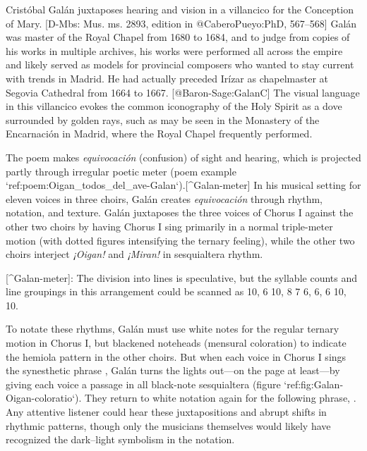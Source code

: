 Cristóbal Galán juxtaposes hearing and vision in a villancico for the Conception of Mary.
[D-Mbs: Mus. ms. 2893, edition in @CaberoPueyo:PhD, 567--568]
Galán was master of the Royal Chapel from 1680 to 1684, and to judge from copies of his works in multiple archives, his works were performed all across the empire and likely served as models for provincial composers who wanted to stay current with trends in Madrid.
He had actually preceded Irízar as chapelmaster at Segovia Cathedral from 1664 to 1667.
[@Baron-Sage:GalanC]
The visual language in this villancico evokes the common iconography of the Holy Spirit as a dove surrounded by golden rays, such as may be seen in the Monastery of the Encarnación in Madrid, where the Royal Chapel frequently performed.
\Autocite[69--70, 81: The image was painted on the ceiling of the monastery's Capilla del Cordero and when a new church building was added later, this image was incorporated as the central element atop the high altar.]{Sanz:GuiaDescalzasEncarnacion}

The poem makes \emph{equivocación} (confusion) of sight and hearing, which is projected partly through irregular poetic meter (poem example `ref:poem:Oigan_todos_del_ave-Galan`).[^Galan-meter]  In his musical setting for eleven voices in three choirs, Galán creates \emph{equivocación} through rhythm, notation, and texture.
Galán juxtaposes the three voices of Chorus I against the other two choirs by having Chorus I sing primarily in a normal triple-meter motion (with dotted figures intensifying the ternary feeling), while the other two choirs interject \emph{¡Oigan!} and \emph{¡Miran!} in sesquialtera rhythm.

[^Galan-meter]:  The division into lines is speculative, but the syllable counts and line groupings in this arrangement could be scanned as  10, 6 10, 8 7 6, 6, 6 10, 10.


\label{poem:Oigan_todos_del_ave-Galan}

To notate these rhythms, Galán must use white notes for the regular ternary motion in Chorus I, but blackened noteheads (mensural coloration) to indicate the hemiola pattern in the other choirs.
But when each voice in Chorus I sings the synesthetic phrase , Galán turns the lights out---on the page at least---by giving each voice a passage in all black-note sesquialtera (figure `ref:fig:Galan-Oigan-coloratio`).
They return to white notation again for the following phrase, .
Any attentive listener could hear these juxtapositions and abrupt shifts in rhythmic patterns, though only the musicians themselves would likely have recognized the dark--light symbolism in the notation.
\Autocite[36]{Kendrick:Jeremiah}


